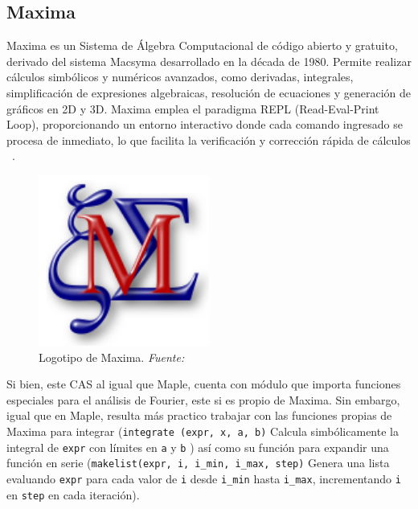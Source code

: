 \subsection{Maxima}
Maxima es un Sistema de Álgebra Computacional de código abierto y gratuito, derivado del sistema Macsyma desarrollado en la década de 1980. Permite realizar cálculos simbólicos y numéricos avanzados, como derivadas, integrales, simplificación de expresiones algebraicas, resolución de ecuaciones y generación de gráficos en 2D y 3D. Maxima emplea el paradigma REPL (Read-Eval-Print Loop), proporcionando un entorno interactivo donde cada comando ingresado se procesa de inmediato, lo que facilita la verificación y corrección rápida de cálculos ~\cite{MaximaSourgeforce}. 
\begin{figure}[H]
	\centering
	\includegraphics[width=0.5\textwidth]{img/chapter02/logo_maxima.png}
	\caption[Logotipo de Maxima.]{Logotipo de Maxima. \textit{Fuente: ~\cite{MaximaSourgeforce}}}
	\label{fig:logo-maxima}  %
\end{figure}
Si bien, este CAS al igual que Maple, cuenta con módulo que importa funciones especiales para el análisis de Fourier, este si es propio de Maxima. Sin embargo, igual que en Maple, resulta más practico trabajar con las funciones propias de Maxima para integrar (\texttt{integrate (expr, x, a, b)} Calcula simbólicamente la integral de \texttt{expr} con límites en \texttt{a} y \texttt{b} ) así como su función para expandir una función en serie (\texttt{makelist(expr, i, i\_min, i\_max, step)} Genera una lista evaluando \texttt{expr} para cada valor de \texttt{i} desde \texttt{i\_min} hasta \texttt{i\_max}, incrementando \texttt{i} en \texttt{step} en cada iteración). 

